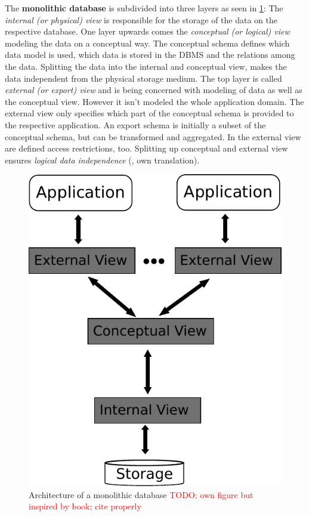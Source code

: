The \textbf{monolithic database} is subdivided into three layers as seen in \ref{MonolithicDatabaseArchitecture}: The \textit{internal (or physical) view} is responsible for the storage of the data on the respective database. One layer upwards comes the \textit{conceptual (or logical) view} modeling the data on a conceptual way. The conceptual schema defines which data model is used, which data is stored in the DBMS and the relations among the data.
Splitting the data into the internal and conceptual view, makes the data independent from the physical storage medium. The top layer is called \textit{external (or export) view} and is being concerned with modeling of data as well as the conceptual view. However it isn't modeled the whole application domain. The external view only specifies which part of the conceptual schema is provided to the respective application. An export schema is initially a subset of the conceptual schema, but can be transformed and aggregated. In the external view are defined access restrictions, too. Splitting up conceptual and external view ensures \textit{logical data independence} (\cite[p. 84/85]{DBLP:books/dp/LeserN2006}, own translation).
\begin{figure}[H]
	\begin{center}
		\includegraphics[scale=0.5]{figures/monolithicalDatabaseArchitecture.pdf}
	\end{center}
	\caption{Architecture of a monolithic database \textcolor{red}{TODO: own figure but inspired by book; cite properly}}
	\label{MonolithicDatabaseArchitecture}
\end{figure}
